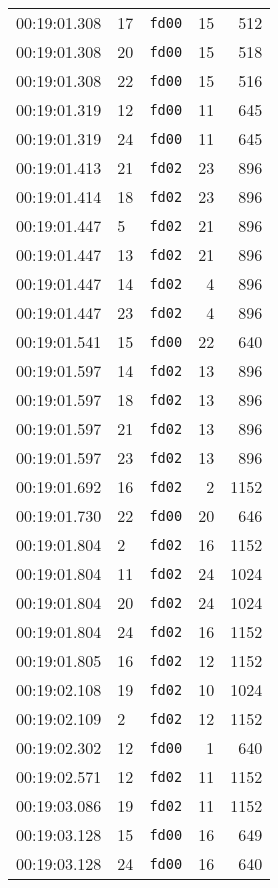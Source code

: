 \documentclass{article}
\begin{document}
\begin{longtable}{lllrr}
00:19:01.308 & 17 & \texttt{fd00} & 15 & 512 \\
00:19:01.308 & 20 & \texttt{fd00} & 15 & 518 \\
00:19:01.308 & 22 & \texttt{fd00} & 15 & 516 \\
00:19:01.319 & 12 & \texttt{fd00} & 11 & 645 \\
00:19:01.319 & 24 & \texttt{fd00} & 11 & 645 \\
00:19:01.413 & 21 & \texttt{fd02} & 23 & 896 \\
00:19:01.414 & 18 & \texttt{fd02} & 23 & 896 \\
00:19:01.447 & 5 & \texttt{fd02} & 21 & 896 \\
00:19:01.447 & 13 & \texttt{fd02} & 21 & 896 \\
00:19:01.447 & 14 & \texttt{fd02} & 4 & 896 \\
00:19:01.447 & 23 & \texttt{fd02} & 4 & 896 \\
00:19:01.541 & 15 & \texttt{fd00} & 22 & 640 \\
00:19:01.597 & 14 & \texttt{fd02} & 13 & 896 \\
00:19:01.597 & 18 & \texttt{fd02} & 13 & 896 \\
00:19:01.597 & 21 & \texttt{fd02} & 13 & 896 \\
00:19:01.597 & 23 & \texttt{fd02} & 13 & 896 \\
00:19:01.692 & 16 & \texttt{fd02} & 2 & 1152 \\
00:19:01.730 & 22 & \texttt{fd00} & 20 & 646 \\
00:19:01.804 & 2 & \texttt{fd02} & 16 & 1152 \\
00:19:01.804 & 11 & \texttt{fd02} & 24 & 1024 \\
00:19:01.804 & 20 & \texttt{fd02} & 24 & 1024 \\
00:19:01.804 & 24 & \texttt{fd02} & 16 & 1152 \\
00:19:01.805 & 16 & \texttt{fd02} & 12 & 1152 \\
00:19:02.108 & 19 & \texttt{fd02} & 10 & 1024 \\
00:19:02.109 & 2 & \texttt{fd02} & 12 & 1152 \\
00:19:02.302 & 12 & \texttt{fd00} & 1 & 640 \\
00:19:02.571 & 12 & \texttt{fd02} & 11 & 1152 \\
00:19:03.086 & 19 & \texttt{fd02} & 11 & 1152 \\
00:19:03.128 & 15 & \texttt{fd00} & 16 & 649 \\
00:19:03.128 & 24 & \texttt{fd00} & 16 & 640 \\

\end{longtable}
\end{document}
